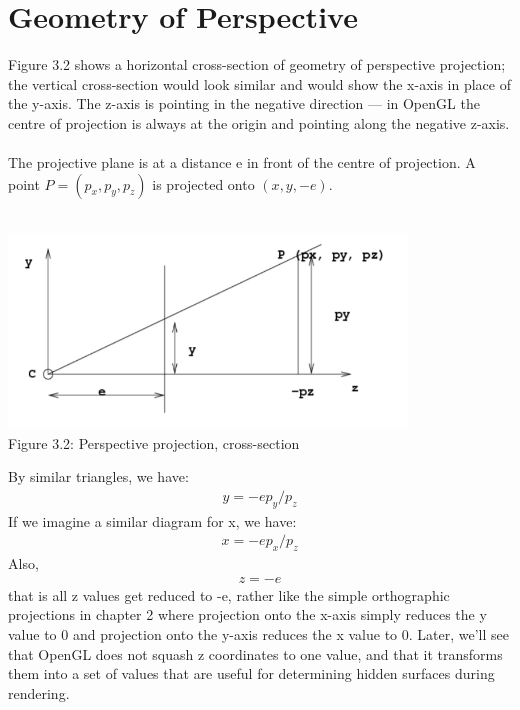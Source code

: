\documentclass[
11pt, %
english, %
singlespacing, %
headsepline, %
]{MastersDoctoralThesis} %
\begin{document}
\section{Geometry of Perspective}
Figure 3.2 shows a horizontal cross-section of geometry of perspective projection; the vertical cross-section would look similar and would show the x-axis in place of the y-axis. The z-axis is pointing in the negative direction — in OpenGL the centre of projection is always at the origin and
pointing along the negative z-axis. \\ \\
The projective plane is at a distance e in front of the centre of projection. A point $P = (p_x , p_y , p_z )$ is projected onto $(x, y,-e)$.
\\ \\
\begin{center}
\includegraphics[width=300pt]{3-2}
\\ Figure 3.2: Perspective projection, cross-section
\end{center}
By similar triangles, we have:
\begin{align*} y = -e p_y/p_z \tag{3.1} \end{align*}
If we imagine a similar diagram for x, we have:
\begin{align*} x = -e p_x/p_z \tag{3.2} \end{align*}
Also, 
\begin{align*} z = -e \tag{3.3} \end{align*}
that is all z values get reduced to -e, rather like the simple orthographic projections in chapter 2 where projection onto the x-axis simply reduces the y value to 0 and projection onto the y-axis reduces the x value to 0. Later, we’ll see that OpenGL does not squash z coordinates to one value, and that it transforms them into a set of values that are useful for determining hidden surfaces during rendering. 
\end{document}
